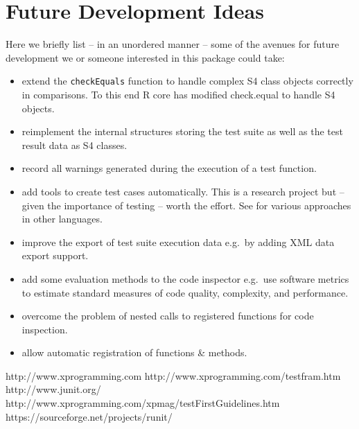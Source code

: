 \documentclass[12pt, a4paper]{article}
\begin{document}
\section{Future Development Ideas}
Here we briefly list -- in an unordered manner -- some of the avenues for future development we or someone interested in this package could take:
\begin{itemize}
\item{extend the {\tt checkEquals} function to handle complex S4 class objects correctly in comparisons. To this end R core has modified check.equal to handle S4 objects.}
\item{reimplement the internal structures storing the test suite as well as the test result data as S4 classes.}
\item{record all warnings generated during the execution of a test function.}
\item{add tools to create test cases automatically. This is a research project but -- given the importance of testing -- worth the effort. See \cite{junit} for various approaches in other languages.}
\item{improve the export of test suite execution data e.g.~by adding XML data export support.}
\item{add some evaluation methods to the code inspector e.g.~use software metrics to estimate standard measures of code quality, complexity, and performance.}
\item{overcome the problem of nested calls to registered functions for code inspection.}
\item{allow automatic registration of functions \& methods.}
\end{itemize}

\begin{thebibliography}{99}
% 
 http://www.xprogramming.com
 http://www.xprogramming.com/testfram.htm
 http://www.junit.org/
 http://www.xprogramming.com/xpmag/testFirstGuidelines.htm
 https://sourceforge.net/projects/runit/
\end{thebibliography}
\end{document}
